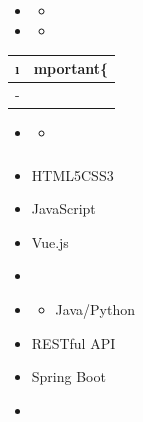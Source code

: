 \hypertarget{section-5}{%
\subsection{}\label{section-5}}

\hypertarget{section-6}{%
\subsubsection{}\label{section-6}}

\important{ }

\begin{itemize}
\item
  \begin{itemize}
  \tightlist
  \item
  \end{itemize}
\item
  \begin{itemize}
  \tightlist
  \item
  \end{itemize}
\end{itemize}

\begin{longtable}[]{@{}ll@{}}
\toprule\noalign{}
\i & mportant\{ } \\
\midrule\noalign{}
\endhead
\bottomrule\noalign{}
\endlastfoot
- & \important{ } \\
\end{longtable}

\begin{itemize}
\item
  \begin{itemize}
  \tightlist
  \item
  \end{itemize}
\end{itemize}

\hypertarget{section-7}{%
\subsubsection{}\label{section-7}}

\important{ }

\begin{itemize}
\item
  HTML5CSS3
\item
  JavaScript
\item
  Vue.js
\item
  \important{ }
\item
  \begin{itemize}
  \tightlist
  \item
    Java/Python
  \end{itemize}
\item
  RESTful API
\item
  Spring Boot
\item ~
  \hypertarget{section-8}{%
  \subsubsection{}\label{section-8}}
\end{itemize}

